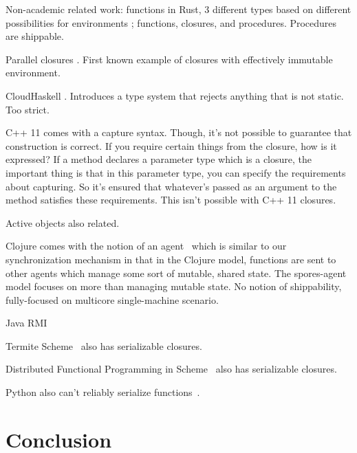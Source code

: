 \documentclass{llncs}
\begin{document}
Non-academic related work: functions in Rust, 3 different types based on
different possibilities for environments \cite{RustFunctions}; functions,
closures, and procedures. Procedures are shippable.

Parallel closures \cite{ParallelClosures}. First known example of closures
with effectively immutable environment.

CloudHaskell \cite{CloudHaskell}. Introduces a type system that rejects anything
that is not static. Too strict.

C++ 11 comes with a capture syntax. Though, it's not possible to guarantee that construction is correct. If you require certain things from the closure, how is it expressed? If a method declares a parameter type which is a closure, the important thing is that in this parameter type, you can specify the requirements about capturing. So it's ensured that whatever's passed as an argument to the method satisfies these requirements. This isn't possible with C++ 11 closures. \cite{Cplusplus11Spec}

Active objects also related. \cite{ActiveObjects}

Clojure comes with the notion of an agent~\cite{Clojure} which is similar to our synchronization mechanism in that in the Clojure model, functions are sent to other agents which manage some sort of mutable, shared state. The spores-agent model focuses on more than managing mutable state. No notion of shippability, fully-focused on multicore single-machine scenario.

Java RMI~\cite{JavaRMI}

Termite Scheme~\cite{Termite} also has serializable closures.

Distributed Functional Programming in Scheme~\cite{DFPS} also has serializable closures.

Python also can't reliably serialize functions~\cite{PythonPickle}.

\section{Conclusion}



\end{document}
